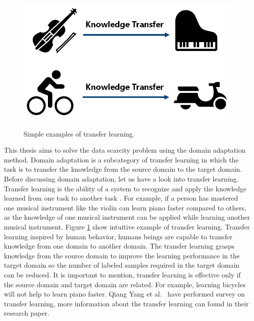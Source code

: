 \begin{figure}[H]
        \begin{center}
 	    \includegraphics[scale=0.40]{images/Introduction/TransferLearning.png}
	    \caption[Simple examples of transfer learning.]{Simple examples of transfer learning.}
	    \label{fig:TransferLearning}
	    \end{center}
\end{figure}

This thesis aims to solve the data scarcity problem using the domain adaptation method. Domain adaptation is a subcategory of transfer learning in which the task is to transfer the knowledge from the source domain to the target domain. Before discussing domain adaptation, let us have a look into transfer learning. Transfer learning is the ability of a system to recognize and apply the knowledge learned from one task to another task \cite{zhuang2020comprehensive}.  For example, if a person has mastered one musical instrument like the violin can learn piano faster compared to others, as the knowledge of one musical instrument can be applied while learning another musical instrument. Figure \ref{fig:TransferLearning} show intuitive example of transfer learning. Transfer learning inspired by human behavior, humans beings are capable to transfer knowledge from one domain to another domain. The transfer learning grasps knowledge from the source domain to improve the learning performance in the target domain so the number of labeled samples required in the target domain can be reduced. It is important to mention, transfer learning is effective only if the source domain and target domain are related. For example, learning bicycles will not help to learn piano faster. Qiang Yang et al.\ \cite{5288526} have performed survey on transfer learning, more information about the transfer learning can found in their research paper.  

